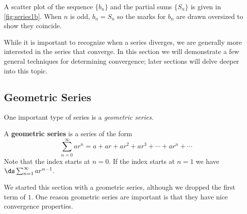 {\begin{enumerate}

A scatter plot of the sequence $\{b_n\}$ and the partial sums $\{S_n\}$ is given in \autoref{fig:series1b}. When $n$ is odd, $b_n = S_n$ so the marks for $b_n$ are drawn oversized to show they coincide.\eoehere
\end{enumerate}}

While it is important to recognize when a series diverges, we are generally more interested in the series that  converge. In this section we will demonstrate a few general techniques for determining convergence; later sections will delve deeper into this topic.

\subsection{Geometric Series}

One important type of series is a \emph{geometric series}.

{A \textbf{geometric series} is a series of the form 
\[\sum_{n=0}^\infty ar^n = a+ar+ar^2+ar^3+\dotsb+ar^n+\dotsb\]
Note that the index starts at $n=0$. If the index starts at $n=1$ we have $\ds \sum_{n=1}^\infty ar^{n-1}$.%
}

We started this section with a geometric series, although we dropped the first term of $1$. One reason geometric series are important is that they have nice convergence properties.

